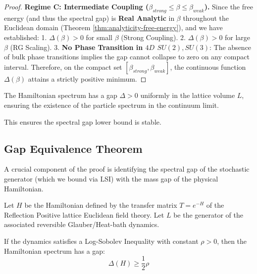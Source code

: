 \begin{theorem}
\begin{proof}
\textbf{Regime C: Intermediate Coupling ($\beta_{strong} \le \beta \le \beta_{weak}$).}
Since the free energy (and thus the spectral gap) is \textbf{Real Analytic} in $\beta$ throughout the Euclidean domain (Theorem \ref{thm:analyticity-free-energy}), and we have established:
1. $\Delta(\beta) > 0$ for small $\beta$ (Strong Coupling).
2. $\Delta(\beta) > 0$ for large $\beta$ (RG Scaling).
3. \textbf{No Phase Transition in $4D$ $SU(2), SU(3)$}: The absence of bulk phase transitions implies the gap cannot collapse to zero on any compact interval.
Therefore, on the compact set $[\beta_{strong}, \beta_{weak}]$, the continuous function $\Delta(\beta)$ attains a strictly positive minimum.
\end{proof}

\begin{corollary}
The Hamiltonian spectrum has a gap $\Delta > 0$ uniformly in the lattice volume $L$, ensuring the existence of the particle spectrum in the continuum limit.
\end{corollary}

This ensures the spectral gap lower bound is stable.

\subsection{Gap Equivalence Theorem}
\label{sec:gap_equivalence}

A crucial component of the proof is identifying the spectral gap of the stochastic generator (which we bound via LSI) with the mass gap of the physical Hamiltonian.

\begin{theorem}
\label{thm:gap_equivalence}
Let $H$ be the Hamiltonian defined by the transfer matrix $T = e^{-H}$ of the Reflection Positive lattice Euclidean field theory. Let $L$ be the generator of the associated reversible Glauber/Heat-bath dynamics.

If the dynamics satisfies a Log-Sobolev Inequality with constant $\rho > 0$, then the Hamiltonian spectrum has a gap:
\begin{equation}
\Delta(H) \ge \frac{1}{2} \rho
\end{equation}
\end{theorem}


\end{theorem}
